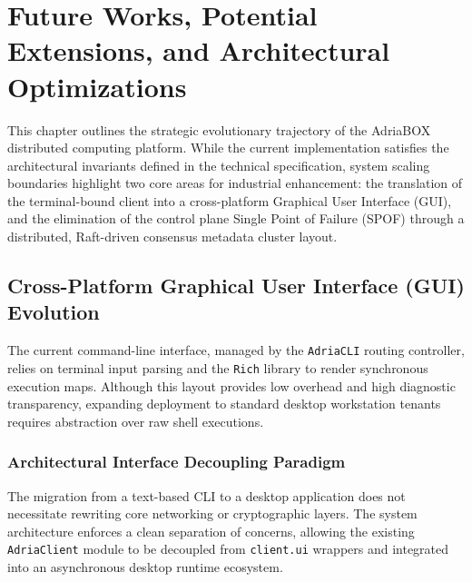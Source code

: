 \section{Future Works, Potential Extensions, and Architectural Optimizations}
\label{sec:future_works}

This chapter outlines the strategic evolutionary trajectory of the AdriaBOX distributed computing platform. While the current implementation satisfies the architectural invariants defined in the technical specification, system scaling boundaries highlight two core areas for industrial enhancement: the translation of the terminal-bound client into a cross-platform Graphical User Interface (GUI), and the elimination of the control plane Single Point of Failure (SPOF) through a distributed, Raft-driven consensus metadata cluster layout.

\subsection{Cross-Platform Graphical User Interface (GUI) Evolution}
The current command-line interface, managed by the \texttt{AdriaCLI} routing controller, relies on terminal input parsing and the \texttt{Rich} library to render synchronous execution maps. Although this layout provides low overhead and high diagnostic transparency, expanding deployment to standard desktop workstation tenants requires abstraction over raw shell executions.

\subsubsection{Architectural Interface Decoupling Paradigm}
The migration from a text-based CLI to a desktop application does not necessitate rewriting core networking or cryptographic layers. The system architecture enforces a clean separation of concerns, allowing the existing \texttt{AdriaClient} module to be decoupled from \texttt{client.ui} wrappers and integrated into an asynchronous desktop runtime ecosystem. 


